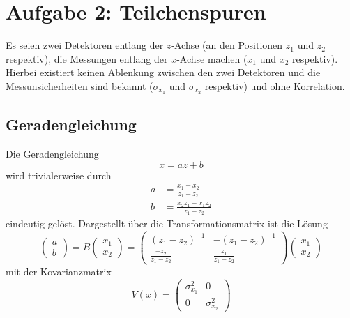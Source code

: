 \section*{Aufgabe 2: Teilchenspuren}
\label{sec:Aufgabe2}
Es seien zwei Detektoren entlang der $z$-Achse (an den Positionen $z_1$ und $z_2$ respektiv), die Messungen entlang der $x$-Achse machen ($x_1$ und $x_2$ respektiv).
Hierbei existiert keinen Ablenkung zwischen den zwei Detektoren und die Messunsicherheiten sind bekannt ($\sigma_{x_1}$ und $\sigma_{x_2}$ respektiv) und ohne Korrelation.

\subsection*{Geradengleichung}
\label{sub:Geradengleichung}
Die Geradengleichung
\begin{equation}
    x=az+b\label{eqn:Geradengleichung}
\end{equation}
wird trivialerweise durch
\begin{align}
    a&=\frac{x_1-x_2}{z_1-z_2}\nonumber\\
    b&=\frac{x_2 z_1 - x_1 z_2}{z_1-z_2}
\end{align}
eindeutig gelöst.
Dargestellt über die Transformationsmatrix ist die Lösung
\begin{equation}
    \left(
        \begin{array}{r}
            a\\
            b
        \end{array}
    \right)
    = B \left(
            \begin{array}{r}
                x_1\\
                x_2
            \end{array}
        \right) =
    \left(
        \begin{array}{rr}
            (z_1-z_2)^{-1}          & -(z_1-z_2)^{-1}\\
            \frac{-z_2}{z_1-z_2}    & \frac{z_1}{z_1-z_2}
        \end{array}
    \right)
    \left(
        \begin{array}{r}
        x_1\\
        x_2
        \end{array}
    \right)
\end{equation}
mit der Kovarianzmatrix
\begin{equation}
    V(x)=
    \left(
        \begin{array}{rr}
            \sigma_{x_1}^2 & 0\\
            0 & \sigma_{x_2}^2
        \end{array}
    \right)
\end{equation}
